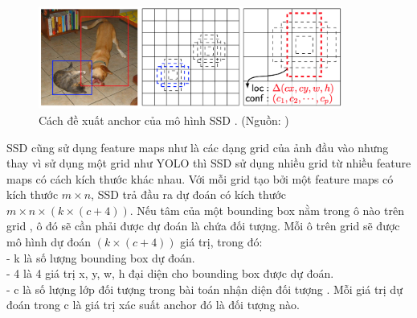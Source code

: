 {    \begin{figure}[H]
        \centering
        \includegraphics[width=10cm] {images/ssd_anchor}
        \caption{Cách đề xuất anchor  của mô hình SSD . (Nguồn: \cite{liu2016ssd})}
        \label{fig:ssd_anchor}
    \end{figure}
    
    \noindent
    SSD  cũng sử dụng feature maps  như là các dạng grid  của ảnh đầu vào nhưng thay vì sử dụng một grid  như YOLO  thì SSD  sử dụng nhiều grid  từ nhiều feature maps  có cách kích thước khác nhau.
    Với mỗi grid  tạo bởi một feature maps  có kích thước $m × n$, SSD  trả đầu ra dự đoán có kích thước $m × n × (k × (c + 4))$.
    Nếu tâm của một bounding box  nằm trong ô nào trên grid , ô đó sẽ cần phải được dự đoán là chứa đối tượng.
    Mỗi ô trên grid  sẽ được mô hình dự đoán $(k × (c + 4))$ giá trị, trong đó: \\
    - k là số lượng bounding box  dự đoán. \\
    - 4 là 4 giá trị x, y, w, h đại diện cho bounding box  được dự đoán. \\
    - c là số lượng lớp đối tượng  trong bài toán nhận diện đối tượng .
    Mỗi giá trị dự đoán trong c là giá trị xác suất anchor  đó là đối tượng nào.

}
